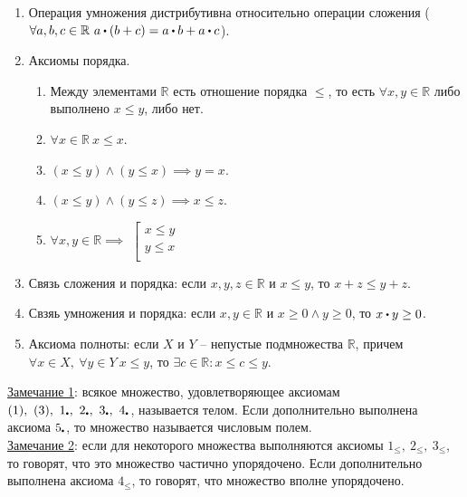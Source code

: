 \documentclass{article}
\begin{document}
\begin{definition}
\begin{enumerate}
            \item Операция умножения дистрибутивна относительно операции сложения (\(\forall a, b, c \in \mathbb{R}\ a \dt (b + c) = a \dt b + a \dt c\)).
            \item Аксиомы порядка. 
            \begin{enumerate}[label=$\arabic*_{\leq}$]
                \item Между элементами \(\mathbb{R}\) есть отношение порядка \(\leq\), то есть \(\forall x, y \in \mathbb{R}\) либо выполнено \(x \leq y\), либо нет.
                \item \(\forall x \in \mathbb{R}\ x \leq x\). 
                \item \((x \leq y) \land (y \leq x) \implies y = x\).
                \item \((x \leq y) \land (y \leq z) \implies x \leq z\).
                \item \(\forall x, y \in \mathbb{R} \implies \) 
                \(\left[ 
                    \begin{gathered}
                        x \leq y\\
                        y \leq x\\
                    \end{gathered}
                \right.\)   
            \end{enumerate}
            \item Связь сложения и порядка: если \(x, y, z \in \mathbb{R}\) и \(x \leq y\), то \(x + z \leq y + z\).
            \item Свзяь умножения и порядка: если \(x, y \in \mathbb{R}\) и \(x \geq 0 \land y \geq 0\), то \(x \dt y \geq 0\).      
            \item Аксиома полноты: если \(X\) и \(Y\) -- непустые подмножества \(\mathbb{R}\), причем \(\forall x \in X,\ \forall y \in Y\ x \leq y\), то \(\exists c \in \mathbb{R}: x \leq c \leq y\).     
        \end{enumerate}
    \end{definition}
    \noindent
    \underline{Замечание 1}: всякое множество, удовлетворяющее аксиомам \((1),\ (3),\ 1_{\dt},\ 2_{\dt},\ 3_{\dt},\ 4_{\dt}\), называется телом.
    Если дополнительно выполнена аксиома \(5_{\dt}\), то множество называется числовым полем.\\
    \underline{Замечание 2}: если для некоторого множества выполняются аксиомы \(1_{\leq},\ 2_{\leq},\ 3_{\leq}\), то говорят,
    что это множество частично упорядочено. Если дополнительно выполнена аксиома \(4_{\leq}\), то говорят, что множество вполне упорядочено.  
\end{document}
